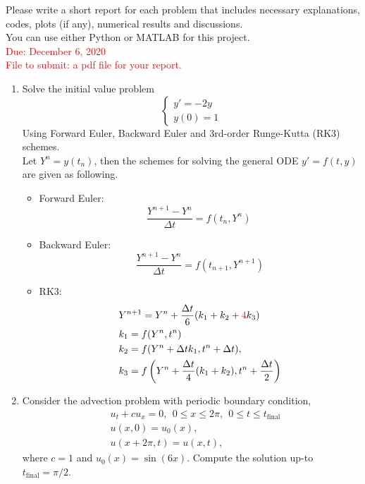 \documentclass[11pt]{article}
\begin{document}

Please write a short report for each problem that includes necessary  explanations, codes, plots (if any),  numerical results and discussions.\\
You can use either Python or MATLAB for this project.\\
\textcolor{red}{Due: December 6, 2020\\
File to submit: a pdf file for your report.
}

\begin{enumerate}
\item  Solve the initial value problem 
$$
\begin{cases}
y'= -2 y\\
y(0)=1
\end{cases}
$$
Using Forward Euler, Backward Euler and 3rd-order  Runge-Kutta (RK3) schemes.   \\

Let $Y^n=y(t_n)$, then the schemes for solving the general ODE $y'=f(t,y)$ are given as following.
\begin{itemize}
\item Forward Euler:
 $$
 \frac{Y^{n+1}- Y^{n}}{\Delta t } =  f(t_n,Y^n) \
  $$
\item Backward Euler:
 $$
 \frac{Y^{n+1}- Y^{n}}{\Delta t } =  f(t_{n+1},Y^{n+1})
  $$
\item RK3:
\begin{align*}
&Y^{n+1}=Y^n+\frac{\Delta t}{6}(k_1+k_2+\textcolor{red}{4}k_3)\\
&k_1=f(Y^n,t^n)\\
&k_2=f(Y^n+\Delta t k_1,t^n+\Delta t),\\
&k_3=f\left(Y^n+\frac{\Delta t}{4}(k_1+k_2),t^n+\frac{\Delta t}{2}\right)
\end{align*}
\end{itemize}

\item Consider the advection problem with periodic boundary condition, 
\begin{align*}
&u_t+cu_x=0,~~0\leq x\leq 2\pi,~~0\leq t\leq t_{\text{final}}\\
& u(x,0)=u_0(x),\\
& u(x+2\pi,t)=u(x,t),
\end{align*}
where $c=1$ and $u_0(x)=\sin(6x)$. Compute the solution up-to $t_\text{final}=\pi/2$.


\end{enumerate}
\end{document}
